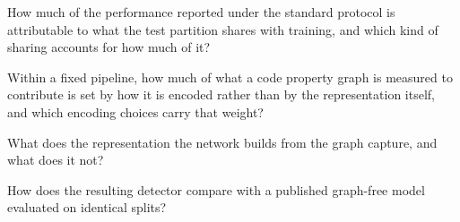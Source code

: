 \begin{description}[leftmargin=2.6em,itemsep=2pt]
  \item[\textbf{RQ1}] How much of the performance reported under the standard
  protocol is attributable to what the test partition shares with training,
  and which kind of sharing accounts for how much of it?
  \item[\textbf{RQ2}] Within a fixed pipeline, how much of what a code
  property graph is measured to contribute is set by how it is encoded rather
  than by the representation itself, and which encoding choices carry that
  weight?
  \item[\textbf{RQ3}] What does the representation the network builds from the
  graph capture, and what does it not?
  \item[\textbf{RQ4}] How does the resulting detector compare with a published
  graph-free model~\citep{fu2022linevul} evaluated on identical splits?
\end{description}

